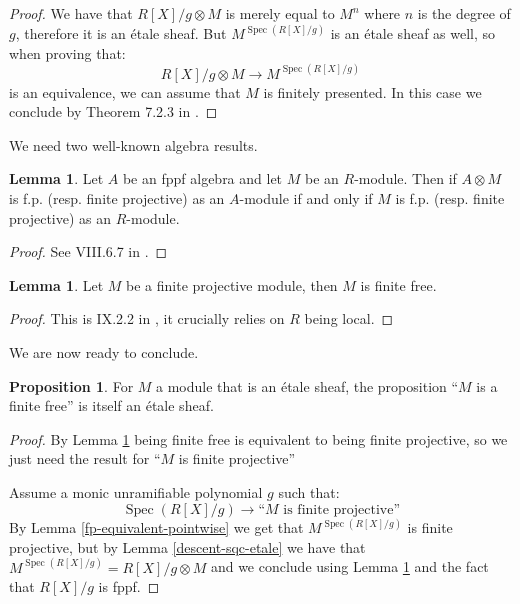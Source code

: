 \documentclass[10pt,a4paper]{article}
\theoremstyle{definition}
\newtheorem{lemma}[theorem]{Lemma}
\newtheorem{proposition}[theorem]{Proposition}
\DeclareMathOperator{\Spec}{Spec}
\begin{document}
\begin{proof}
We have that $R[X]/g\otimes M$ is merely equal to $M^n$ where $n$ is the degree of $g$, therefore it is an \'etale sheaf. But $M^{\Spec(R[X]/g)}$ is an \'etale sheaf as well, so when proving that:
\[R[X]/g\otimes M \to M^{\Spec(R[X]/g)}\]
is an equivalence, we can assume that $M$ is finitely presented. In this case we conclude by Theorem 7.2.3 in \cite{draft}.
\end{proof}

We need two well-known algebra results.

\begin{lemma}\label{fp-stable-etale-tensor}
  Let $A$ be an fppf algebra and let $M$ be an $R$-module. Then if $A\otimes M$ is f.p. (resp. finite projective)
  as an $A$-module if and only if $M$ is f.p. (resp. finite projective) as an $R$-module.
\end{lemma}

\begin{proof}
See VIII.6.7 in \cite{lombardi-quitte}.
\end{proof}

\begin{lemma}\label{finite-projective-free}
Let $M$ be a finite projective module, then $M$ is finite free.
\end{lemma}

\begin{proof}
This is IX.2.2 in \cite{lombardi-quitte}, it crucially relies on $R$ being local.
\end{proof}

We are now ready to conclude.

\begin{proposition}\label{descent-finite-free}
For $M$ a module that is an \'etale sheaf, the proposition ``$M$ is a finite free'' is itself an \'etale sheaf.
\end{proposition}

\begin{proof}
By Lemma \ref{finite-projective-free} being finite free is equivalent to being finite projective, so we just need the result for ``$M$ is finite projective''

Assume a monic unramifiable polynomial $g$ such that:
\[\Spec(R[X]/g) \to \textrm{``$M$ is finite projective''}\]
By Lemma \ref{fp-equivalent-pointwise} we get that $M^{\Spec(R[X]/g)}$ is finite projective, but by Lemma \ref{descent-sqc-etale} we have that $M^{\Spec(R[X]/g)} = R[X]/g\otimes M$ and we conclude using Lemma \ref{fp-stable-etale-tensor} and the fact that $R[X]/g$ is fppf.
\end{proof}
\end{document}
